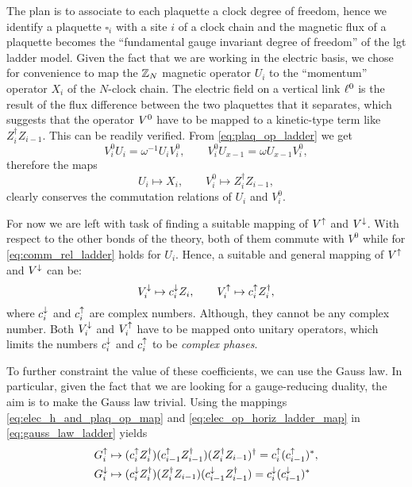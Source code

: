 The plan is to associate to each plaquette a clock degree of freedom, hence we identify a plaquette $\square_i$ with a site $i$ of a clock chain and the magnetic flux of a plaquette becomes the ``fundamental gauge invariant degree of freedom'' of the \ac{lgt} ladder model.
Given the fact that we are working in the electric basis, we chose for convenience to map the $\mathbb{Z}_N$ magnetic operator $U_i$ to the ``momentum'' operator $X_i$ of the $N$-clock chain.
The electric field on a vertical link $\ell^0$ is the result of the flux difference between the two plaquettes that it separates, which suggests that the operator $V^0$ have to be mapped to a kinetic-type term like $Z_i^\dagger Z_{i-1}$.
This can be readily verified.
From \eqref{eq:plaq_op_ladder} we get
\begin{equation*}
    V^0_i U_i = \omega^{-1} U_i V_i^0, \qquad
    V^0_i U_{x-1} = \omega U_{x-1} V_i^0,
\end{equation*}
therefore the maps
\begin{equation*}
    U_i \mapsto X_i, \qquad
    V^0_i \mapsto Z_i^\dagger Z_{i-1},
    \label{eq:elec_h_and_plaq_op_map}
\end{equation*}
clearly conserves the commutation relations of $U_i$ and $V^0_i$.

For now we are left with task of finding a suitable mapping of $V^{\uparrow}$ and $V^{\downarrow}$.
With respect to the other bonds of the theory, both of them commute with $V^0$ while for \eqref{eq:comm_rel_ladder} holds for $U_i$.
Hence, a suitable and general mapping of $V^{\uparrow}$ and $V^{\downarrow}$ can be:
\begin{equation}
    V^{\downarrow}_i \mapsto c^{\downarrow}_i Z_i, \qquad
    V^{\uparrow}_i \mapsto c^{\uparrow}_i Z_i^\dagger,
    \label{eq:elec_op_horiz_ladder_map}
\end{equation}
where $c^{\downarrow}_i$ and $c^{\uparrow}_i$ are complex numbers.
Although, they cannot be any complex number.
Both $V^{\downarrow}_i$ and $V^{\uparrow}_i$ have to be mapped onto unitary operators, which limits the numbers $c^{\downarrow}_i$ and $c^{\uparrow}_i$ to be \emph{complex phases}.

To further constraint the value of these coefficients, we can use the Gauss law.
In particular, given the fact that we are looking for a gauge-reducing duality, the aim is to make the Gauss law trivial.
Using the mappings \eqref{eq:elec_h_and_plaq_op_map} and \eqref{eq:elec_op_horiz_ladder_map} in \eqref{eq:gauss_law_ladder} yields
\begin{equation}
    \begin{split}
        G^\uparrow_i & \mapsto
        (c^{\uparrow}_i Z_i^\dagger) (c^{\uparrow}_{i-1} Z_{i-1}^\dagger) (Z_i^\dagger Z_{i-1})^\dagger
        = c^{\uparrow}_i (c^{\uparrow}_{i-1})^*, \\
        G^\downarrow_i & \mapsto
        (c^{\downarrow}_i Z_i^\dagger) (Z_i^\dagger Z_{i-1}) (c^{\downarrow}_{i-1} Z_{i-1}^\dagger)
        = c^{\downarrow}_i (c^{\downarrow}_{i-1})^*
    \end{split}
    \label{eq:gauss_law_map_ladder}
\end{equation}

